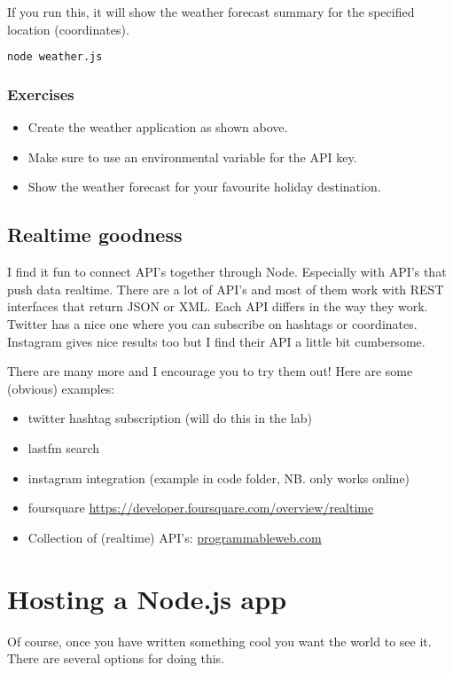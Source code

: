\documentclass[a4paper]{report}
\begin{document}


\noindent If you run this, it will show the weather forecast summary for the specified location (coordinates).

\begin{lstlisting}[language=bash]
node weather.js
\end{lstlisting}

\subsubsection*{Exercises}
\begin{itemize}
	\item Create the weather application as shown above.
	\item Make sure to use an environmental variable for the API key.
	\item Show the weather forecast for your favourite holiday destination.
\end{itemize}

\subsection*{Realtime goodness}
I find it fun to connect API's together through Node. Especially with API's that push data realtime. There are a lot of API's and most of them work with REST interfaces that return JSON or XML. Each API differs in the way they work. Twitter has a nice one where you can subscribe on hashtags or coordinates. Instagram gives nice results too but I find their API a little bit cumbersome. 

There are many more and I encourage you to try them out! Here are some (obvious) examples:

\begin{itemize}
	\item twitter hashtag subscription (will do this in the lab)
	\item lastfm search
	\item instagram integration (example in code folder, NB. only works online)
	\item foursquare \href{https://developer.foursquare.com/overview/realtime}{https://developer.foursquare.com/overview/realtime}
	\item Collection of (realtime) API's: \href{http://www.programmableweb.com/}{programmableweb.com}
\end{itemize}

\section*{Hosting a Node.js app}
Of course, once you have written something cool you want the world to see it. There are several options for doing this.
\end{document}

